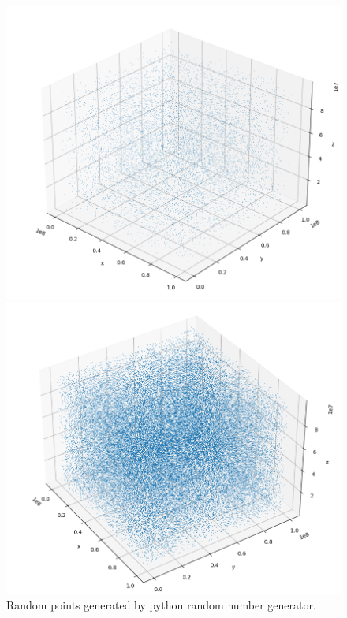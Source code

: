 \documentclass[showpacs, oneside, onecolumn, prl, amsmath, amssymb, nofootinbib, superscriptaddress, notitlepage]{revtex4-1}
\newcommand\bfig{\begin{figure}}
\newcommand\efig{\end{figure}}
\begin{document}
\bfig
	\centering
	\subfigure
	{\begin{minipage}[b]{1\textwidth}
	\includegraphics[scale=0.6]{6-1-python.png}
	\end{minipage}}
	\subfigure
	{\begin{minipage}[b]{1\textwidth}
	\includegraphics[scale=0.6]{6-1-python1.png}
	\end{minipage}}
	\caption{Random points generated by python random number generator.}
	\label{6-1-2}
\efig
\end{document}
